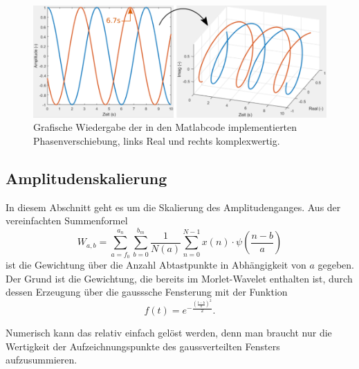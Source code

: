 \begin{figure}
	\centering
	\includegraphics[width=\textwidth]{papers/wavelets/images/10-3_PhaseShiftBsp.png}
	\caption{Grafische Wiedergabe der in den Matlabcode
	implementierten Phasenverschiebung, links Real und rechts
	komplexwertig.}
	\label{wavelet:fig:PhaseShiftBsp}
\end{figure}

\subsection{Amplitudenskalierung
	\label{wavelets:subsection:Amplitudenskalierung}}
In diesem Abschnitt geht es um die Skalierung des Amplitudenganges.
Aus der vereinfachten Summenformel
\[
W_{a,b}
=
\sum_{a=f_0}^{a_n}\sum_{b=0}^{b_m}\frac{1}{N(a)}\sum_{n=0}^{N-1}
x(n)\cdot\psi\left(\frac{n-b}{a}\right)
\]
ist die Gewichtung über die Anzahl Abtastpunkte in Abhängigkeit von $a$
gegeben.
Der Grund ist die Gewichtung, die bereits im Morlet-Wavelet enthalten
ist, durch dessen Erzeugung über die gausssche Fensterung mit der
Funktion \[f(t)=e^{-\frac{\left(\frac{t-b}{a}\right)^2}{2}}.\]

Numerisch kann das relativ einfach gelöst werden, denn man braucht
nur die Wertigkeit der Aufzeichnungspunkte des gaussverteilten
Fensters aufzusummieren.

